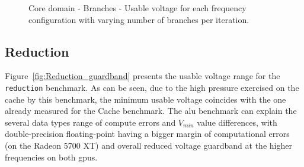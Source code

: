 
\begin{figure}[!htb]
    \centering
    \begin{subfigmatrix}{2}
      \label{fig:Branches_guardband}
    \end{subfigmatrix}
    \caption{Core domain - Branches - Usable voltage for each frequency configuration with varying number of branches per iteration.}
\end{figure}

\subsection{Reduction}

Figure~\ref{fig:Reduction_guardband} presents the usable voltage range for the \texttt{reduction} benchmark. As can be seen, due to the high pressure exercised on the cache by this benchmark, the minimum usable voltage coincides with the one already measured for the Cache benchmark. The \acrshort{alu} benchmark can explain the several data types range of compute errors and $V_{min}$ value differences, with double-precision floating-point having a bigger margin of computational errors (on the Radeon 5700 XT) and overall reduced voltage guardband at the higher frequencies on both \acrshort{gpu}s.

